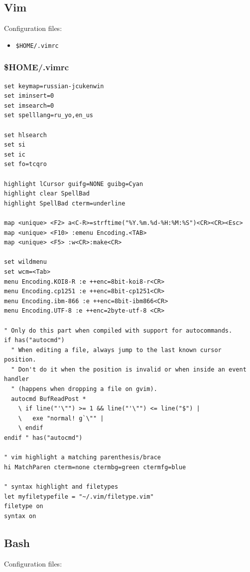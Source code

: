 \documentclass[12pt,a4paper]{article}
\begin{document}
\subsection{Vim}

Configuration files:

\begin{itemize}
\item \verb"$HOME/.vimrc"
\end{itemize}

\subsubsection{\$HOME/.vimrc}

\begin{verbatim}
set keymap=russian-jcukenwin
set iminsert=0
set imsearch=0
set spelllang=ru_yo,en_us

set hlsearch
set si
set ic
set fo=tcqro

highlight lCursor guifg=NONE guibg=Cyan
highlight clear SpellBad
highlight SpellBad cterm=underline

map <unique> <F2> a<C-R>=strftime("%Y.%m.%d-%H:%M:%S")<CR><CR><Esc>
map <unique> <F10> :emenu Encoding.<TAB>
map <unique> <F5> :w<CR>:make<CR>

set wildmenu
set wcm=<Tab>
menu Encoding.KOI8-R :e ++enc=8bit-koi8-r<CR>
menu Encoding.cp1251 :e ++enc=8bit-cp1251<CR>
menu Encoding.ibm-866 :e ++enc=8bit-ibm866<CR>
menu Encoding.UTF-8 :e ++enc=2byte-utf-8 <CR>

" Only do this part when compiled with support for autocommands.
if has("autocmd")
  " When editing a file, always jump to the last known cursor position.
  " Don't do it when the position is invalid or when inside an event handler
  " (happens when dropping a file on gvim).
  autocmd BufReadPost *
    \ if line("'\"") >= 1 && line("'\"") <= line("$") |
    \   exe "normal! g`\"" |
    \ endif
endif " has("autocmd")

" vim highlight a matching parenthesis/brace
hi MatchParen cterm=none ctermbg=green ctermfg=blue

" syntax highlight and filetypes
let myfiletypefile = "~/.vim/filetype.vim"
filetype on
syntax on
\end{verbatim}

\subsection{Bash}

Configuration files:
\end{document}
